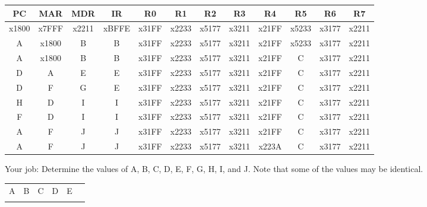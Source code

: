 \documentclass{patt}
\begin{document}
\begin{exercises}
\begin{table}[h!]
\begin{center}
\large
\begin{tabular}{|c|c|c|c|c|c|c|c|c|c|c|c|}
\hline
PC     & MAR   & MDR   & IR    & R0    & R1    & R2    & R3    & R4    & R5    & R6    & R7    \\ \hline \hline
x1800  & x7FFF & x2211 & xBFFE & x31FF & x2233 & x5177 & x3211 & x21FF & x5233 & x3177 & x2211 \\ \hline \hline
A      & x1800 & B     & B     & x31FF & x2233 & x5177 & x3211 & x21FF & x5233 & x3177 & x2211 \\ \hline
A      & x1800 & B     & B     & x31FF & x2233 & x5177 & x3211 & x21FF & C     & x3177 & x2211 \\ \hline \hline
D      & A     & E     & E     & x31FF & x2233 & x5177 & x3211 & x21FF & C     & x3177 & x2211 \\ \hline
D      & F     & G     & E     & x31FF & x2233 & x5177 & x3211 & x21FF & C     & x3177 & x2211 \\ \hline \hline
H      & D     & I     & I     & x31FF & x2233 & x5177 & x3211 & x21FF & C     & x3177 & x2211 \\ \hline
F      & D     & I     & I     & x31FF & x2233 & x5177 & x3211 & x21FF & C     & x3177 & x2211 \\ \hline \hline
A      & F     & J     & J     & x31FF & x2233 & x5177 & x3211 & x21FF & C     & x3177 & x2211 \\ \hline
A      & F     & J     & J     & x31FF & x2233 & x5177 & x3211 & x223A & C     & x3177 & x2211 \\ \hline
\end{tabular}
\end{center}
\end{table}

\noindent
Your job: Determine the values of A, B, C, D, E, F, G, H, I, and J. Note that
some of the values may be identical. \\

\begin{table}[h!]
\begin{center}
\large
\begin{tabular}{|m{2cm}|m{2cm}|m{2cm}|m{2cm}|m{2cm}|m{1mm}}
\cline{1-5}
A     & B     & C     & D     & E     & \\[10pt] \cline{1-5}
      &       &       &       &       & \\[10pt] \cline{1-5}
\end{tabular}
\end{center}
\end{table}


\end{exercises}
\end{document}
